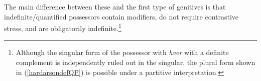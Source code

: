 \documentclass[output=paper,colorlinks,citecolor=brown,
]{langscibook}
\begin{document}
The main difference between these and the first type of genitives is that indefinite/quantified possessors contain modifiers, do not require contrastive stress, and are obligatorily indefinite.\footnote{Although the singular form of the possessor with \textit{hver} with a definite complement is independently ruled out in the singular, the plural form shown in (\ref{hardarsondefQP}) is possible under a partitive interpretation.}


\begin{exe}
	\ex	\label{hardarsonbadQ}
		\begin{xlist}
		\setlength{\columnsep}{10pt}
		\begin{multicols}{2}
			\label{hardarsondefQP}
		\end{multicols}
		\end{xlist}
\end{exe}


\begin{comment}
\begin{exe}
	\ex	
		\begin{xlist}
		\begin{multicols}{2}
			\ex[]{	\gll	ráð [heimsk-ra mann-a]\\
							advice foolish-{\hardGen} men-{\hardGen}\\
					\glt	`advice of fools'
					}
			\ex[]{	\gll	hús [hver-s manns-s]\\
							house each-{\hardGen} man-{\hardGen}\\
					\glt	`each man's house'
					}
		\end{multicols}
		\end{xlist}
	\ex	
		\begin{xlist}
		\begin{multicols}{2}
			\ex[]{	\gll	saga [hálf-rar ald-ar]\\
							history half-{\hardGen} century-{\hardGen}\\
					\glt	`events of a particular 50 year span'
					}
			\ex[*?]{	\gll	tálbeita [tvenn-s kon-ar]\\
							lure two-{\hardGen} kind-{\hardGen}\\
					\glt	`two kinds of lures' 
					}
		\end{multicols}
		\end{xlist}
\end{exe}
\end{comment}
\end{document}
